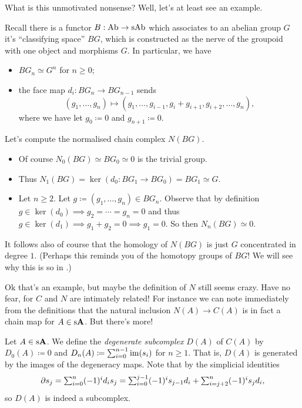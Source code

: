 What is this unmotivated nonsense? Well, let's at least see an example.

\begin{example}
  \label{BG}
  Recall there is a functor $B : \mathrm{Ab} \to \mathrm{s}\mathrm{Ab}$ which associates to an
  abelian group $G$ it's ``classifying space'' $BG$, which is
  constructed as the nerve of the groupoid with one object and
  morphisms $G$. In particular, we have
  \begin{itemize}
  \item $BG_n \simeq G^n$ for $n \ge 0$;
  \item the face map $d_i : BG_n \to BG_{n-1}$ sends
    \[
    (g_1,\ldots,g_n) \mapsto (g_1,\ldots,g_{i-1}, g_i + g_{i+1},
    g_{i+2}, \ldots, g_n),
    \]
    where we have let $g_0 \coloneqq 0$ and $g_{n+1} \coloneqq 0$.
  \end{itemize}
  Let's compute the normalised chain complex $N(BG)$.
  \begin{itemize}
  \item Of course $N_0(BG) \simeq BG_0 \simeq 0$ is the trivial group.
  \item Thus $N_1(BG) = \ker(d_0 : BG_1 \to BG_0) = BG_1 \simeq G$.
  \item Let $n \ge 2$. Let $g \coloneqq (g_1, \ldots, g_n) \in
    BG_n$. Observe that by definition $g \in \ker(d_0) \implies g_2 =
    \cdots = g_n = 0$ and thus $g \in \ker(d_1) \implies g_1 + g_2 = 0
    \implies g_1 = 0$. So then $N_n(BG) \simeq 0$.
  \end{itemize}
  It follows also of course that the homology of $N(BG)$ is just $G$
  concentrated in degree $1$. (Perhaps this reminds you of the
  homotopy groups of $BG$! We will see why this is so in .)
\end{example}

Ok that's an example, but maybe the definition of $N$ still seems
crazy. Have no fear, for $C$ and $N$ are intimately related! For
instance we can note immediately from the definitions that the natural
inclusion $N(A) \to C(A)$ is in fact a chain map for $A \in \mathrm{s}\mathbf{A}$. But
there's more!

\begin{definition}
  Let $A \in \mathrm{s}\mathbf{A}$. We define the \textit{degenerate subcomplex}
  $D(A)$ of $C(A)$ by $D_0(A) \coloneqq 0$ and $D_n(A) \coloneqq
  \sum_{i=0}^{n-1} \operatorname{im}(s_i)$ for $n \ge 1$. That is, $D(A)$ is
  generated by the images of the degeneracy maps. Note that by the
  simplicial identities
  \[
  \textstyle{\partial s_j = \sum_{i=0}^n (-1)^i d_i s_j = \sum_{i=0}^{j-1}
    (-1)^i s_{j-1} d_i + \sum_{i=j+2}^n (-1)^i s_j d_i,}
  \]
  so $D(A)$ is indeed a subcomplex.
\end{definition}

